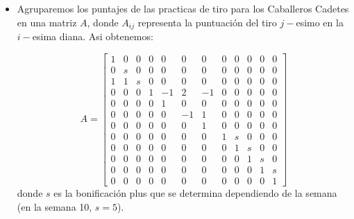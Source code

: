 \documentclass[12pt,a4paper]{article}
\begin{document}
\begin{itemize}
	
	\item Agruparemos los puntajes de las practicas de tiro para los Caballeros Cadetes en una matriz $A$, donde $A_{ij}$ representa la puntuación del tiro $j-$esimo en la $i-$esima diana. Asi obtenemos:
	
	\setcounter{MaxMatrixCols}{20}
	\begin{equation}\label{item1}
	A = \begin{bmatrix}
	1& 0& 0& 0&  0&  0&  0& 0& 0& 0& 0& 0\\
	0& s& 0& 0&  0&  0&  0& 0& 0& 0& 0& 0\\
	1& 1& s& 0&  0&  0&  0& 0& 0& 0& 0& 0\\
	0& 0& 0& 1& -1&  2& -1& 0& 0& 0& 0& 0\\
	0& 0& 0& 0&  1&  0&  0& 0& 0& 0& 0& 0\\
	0& 0& 0& 0&  0& -1&  1& 0& 0& 0& 0& 0\\
	0& 0& 0& 0&  0&  0&  1& 0& 0& 0& 0& 0\\
	0& 0& 0& 0&  0&  0&  0& 1& s& 0& 0& 0\\
	0& 0& 0& 0&  0&  0&  0& 0& 1& s& 0& 0\\
	0& 0& 0& 0&  0&  0&  0& 0& 0& 1& s& 0\\
	0& 0& 0& 0&  0&  0&  0& 0& 0& 0& 1& s\\
	0& 0& 0& 0&  0&  0&  0& 0& 0& 0& 0& 1
	\end{bmatrix}
	\end{equation}
	donde $s$ es la bonificación plus que se determina dependiendo de la semana (en la semana 10, $s=5$).
	

\end{itemize}
\end{document}
